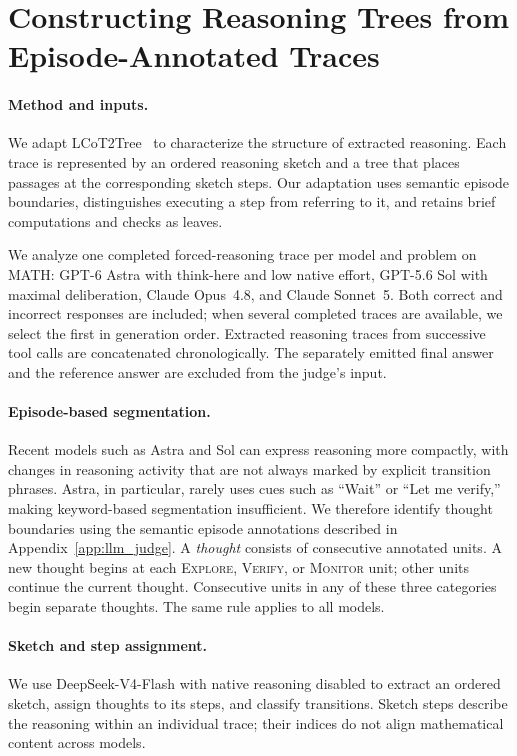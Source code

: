 \section{Constructing Reasoning Trees from Episode-Annotated Traces}
\label{app:reasoning_tree_construction}

\paragraph{Method and inputs.}
We adapt LCoT2Tree~\citep{jiang-etal-2025-makes} to characterize the
structure of extracted reasoning. Each trace is represented by an ordered
reasoning sketch and a tree that places passages at the corresponding
sketch steps. Our adaptation uses semantic episode boundaries, distinguishes
executing a step from referring to it, and retains brief computations and
checks as leaves.

We analyze one completed forced-reasoning trace per model and problem on
MATH: GPT-6 Astra with think-here and low native effort, GPT-5.6 Sol with
maximal deliberation, Claude Opus~4.8, and Claude Sonnet~5. Both correct and
incorrect responses are included; when several completed traces are
available, we select the first in generation order. Extracted reasoning traces from
successive tool calls are concatenated chronologically. The separately
emitted final answer and the reference answer are excluded from the judge's
input.

\paragraph{Episode-based segmentation.}
Recent models such as Astra and Sol can express reasoning more compactly,
with changes in reasoning activity that are not always marked by explicit
transition phrases. Astra, in particular, rarely uses cues such as
``Wait'' or ``Let me verify,'' making keyword-based segmentation insufficient.
We therefore identify thought boundaries using the semantic episode
annotations described in Appendix~\ref{app:llm_judge}.
A \emph{thought} consists of consecutive annotated units.
A new thought begins at each \textsc{Explore}, \textsc{Verify}, or
\textsc{Monitor} unit; other units continue the current thought.
Consecutive units in any of these three categories begin separate thoughts.
The same rule applies to all models.


\paragraph{Sketch and step assignment.}
We use DeepSeek-V4-Flash with native reasoning disabled
to extract an ordered sketch, assign thoughts to its steps, and classify
transitions. Sketch steps describe the reasoning within an individual
trace; their indices do not align mathematical content across models.


